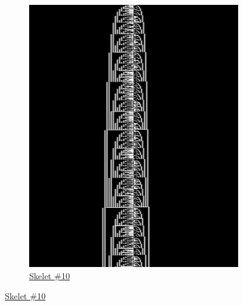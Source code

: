 \begin{figure}[h!]
\begin{minipage}{\textwidth}
\begin{subfigure}{0.3\textwidth}
            \includegraphics[width=\linewidth]{figures/sporadic-machines/sk10.png}
            \caption*{\href{https://bbchallenge.org/example3}{Skelet \#10}}
        \end{subfigure}
    \end{minipage}

    \vspace{1.5em}


\end{figure}
